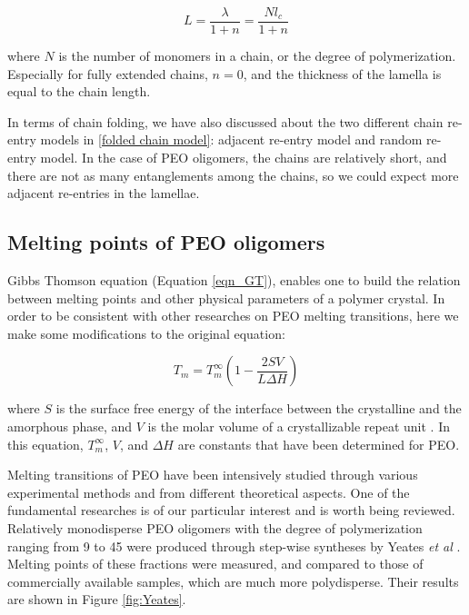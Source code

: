 \begin{equation}
\label{eqn_thickness}
L = \dfrac{\lambda}{1+n} = \dfrac{N l_{c}}{1+n}
\end{equation}

\noindent
where $N$ is the number of monomers in a chain, or the degree of polymerization. Especially for fully extended chains, $n = 0$, and the thickness of the lamella is equal to the chain length.

In terms of chain folding, we have also discussed about the two different chain re-entry models in \ref{folded chain model}: adjacent re-entry model and random re-entry model. In the case of PEO oligomers, the chains are relatively short, and there are not as many entanglements among the chains, so we could expect more adjacent re-entries in the lamellae.

\subsection{Melting points of PEO oligomers} \label{Tm and Yeates}

Gibbs Thomson equation (Equation \ref{eqn_GT}), enables one to build the relation between melting points and other physical parameters of a polymer crystal. In order to be consistent with other researches on PEO melting transitions, here we make some modifications to the original equation:

\begin{equation}
\label{eqn_GT2}
T_{m} = T_{m}^{\infty} (1 - \dfrac{2SV}{L \Delta H})
\end{equation}

\noindent
where $S$ is the surface free energy of the interface between the crystalline and the amorphous phase, and $V$ is the molar volume of a crystallizable repeat unit \cite{Pfefferkorn2011}. In this equation, $T_{m}^{\infty}$, $V$, and $\Delta H$ are constants that have been determined for PEO.

Melting transitions of PEO have been intensively studied through various experimental methods and from different theoretical aspects. One of the fundamental researches is of our particular interest and is worth being reviewed. Relatively monodisperse PEO oligomers with the degree of polymerization ranging from 9 to 45 were produced through step-wise syntheses by Yeates \textit{et al} \cite{Yeates1984}. Melting points of these fractions were measured, and compared to those of commercially available samples, which are much more polydisperse. Their results are shown in Figure \ref{fig:Yeates}.

